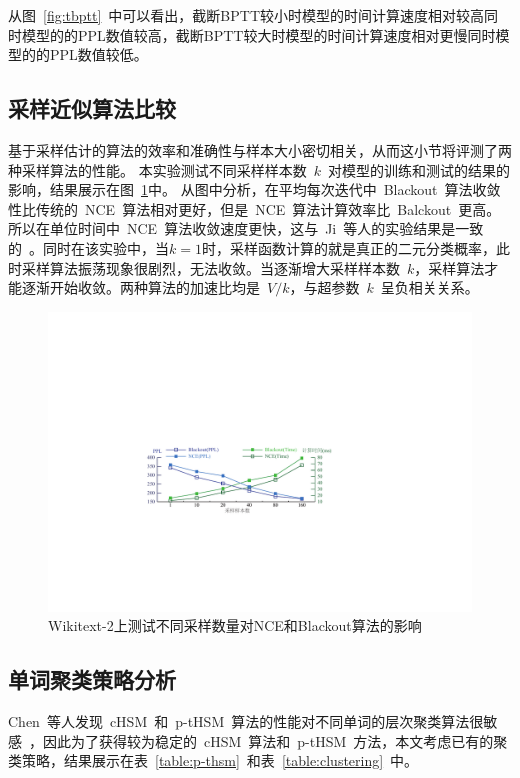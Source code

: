 从图~\ref{fig:tbptt}~中可以看出，截断BPTT较小时模型的时间计算速度相对较高同时模型的的PPL数值较高，截断BPTT较大时模型的时间计算速度相对更慢同时模型的的PPL数值较低。


\subsection{采样近似算法比较}
基于采样估计的算法的效率和准确性与样本大小密切相关，从而这小节将评测了两种采样算法的性能。
本实验测试不同采样样本数~$k$~对模型的训练和测试的结果的影响，结果展示在图~\ref{fig:blackout_nce}中。
从图中分析，在平均每次迭代中~Blackout~算法收敛性比传统的~NCE~算法相对更好，但是~NCE~算法计算效率比~Balckout~更高。所以在单位时间中~NCE~算法收敛速度更快，这与~Ji~等人的实验结果是一致的~。同时在该实验中，当$k=1$时，采样函数计算的就是真正的二元分类概率，此时采样算法振荡现象很剧烈，无法收敛。当逐渐增大采样样本数~$k$，采样算法才能逐渐开始收敛。两种算法的加速比均是~$V/k$，与超参数~$k$~呈负相关关系。

\begin{figure}[!t]
  \centering
  \includegraphics[width=.85\columnwidth]{./figures/nce_blackout.pdf}
  \caption{Wikitext-2上测试不同采样数量对NCE和Blackout算法的影响}\label{fig:blackout_nce}
\end{figure}


\subsection{单词聚类策略分析}
Chen~等人发现~cHSM~和~p-tHSM~算法的性能对不同单词的层次聚类算法很敏感~，因此为了获得较为稳定的~cHSM~算法和~p-tHSM~方法，本文考虑已有的聚类策略，结果展示在表~\ref{table:p-thsm}~和表~\ref{table:clustering}~中。

